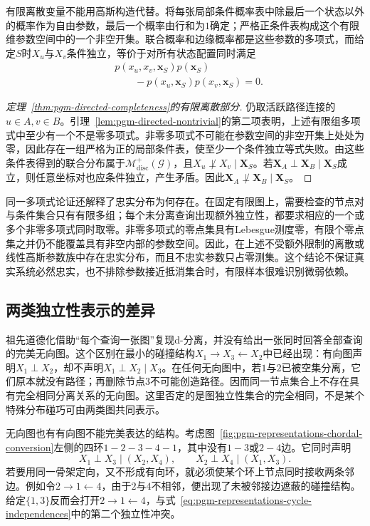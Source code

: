 有限离散变量不能用高斯构造代替。将每张局部条件概率表中除最后一个状态以外的概率作为自由参数，最后一个概率由行和为$1$确定；严格正条件表构成这个有限维参数空间中的一个非空开集。联合概率和边缘概率都是这些参数的多项式，而给定$S$时$X_u$与$X_v$条件独立，等价于对所有状态配置同时满足
\[
  \begin{aligned}
    &p(x_u,x_v,\bm x_S)p(\bm x_S)\\
    &\qquad{}-p(x_u,\bm x_S)p(x_v,\bm x_S)=0.
  \end{aligned}
\]

\begin{proof}[定理~\ref{thm:pgm-directed-completeness}的有限离散部分]
仍取活跃路径连接的$u\in A,v\in B$。引理~\ref{lem:pgm-directed-nontrivial}的第二项表明，上述有限组多项式中至少有一个不是零多项式。非零多项式不可能在参数空间的非空开集上处处为零，因此存在一组严格为正的局部条件表，使至少一个条件独立等式失败。由这些条件表得到的联合分布属于$\mathcal{M}_{\mathrm{disc}}^{+}(\mathcal{G})$，且$X_u\not\perp X_v\mid\bm X_S$。若$\bm X_A\perp\bm X_B\mid\bm X_S$成立，则任意坐标对也应条件独立，产生矛盾。因此$\bm X_A\not\perp\bm X_B\mid\bm X_S$。
\end{proof}

同一多项式论证还解释了忠实分布为何存在。在固定有限图上，需要检查的节点对与条件集合只有有限多组；每个未分离查询出现额外独立性，都要求相应的一个或多个非零多项式同时取零。非零多项式的零点集具有Lebesgue测度零，有限个零点集之并仍不能覆盖具有非空内部的参数空间。因此，在上述不受额外限制的离散或线性高斯参数族中存在忠实分布，而且不忠实参数只占零测集。这个结论不保证真实系统必然忠实，也不排除参数接近抵消集合时，有限样本很难识别微弱依赖。

\subsection{两类独立性表示的差异}
\label{sec:pgm-representations-independence-differences}

祖先道德化借助“每个查询一张图”复现d-分离，并没有给出一张同时回答全部查询的完美无向图。这个区别在最小的碰撞结构$X_1\to X_3\leftarrow X_2$中已经出现：有向图声明$X_1\perp X_2$，却不声明$X_1\perp X_2\mid X_3$。在任何无向图中，若$1$与$2$已被空集分离，它们原本就没有路径；再删除节点$3$不可能创造路径。因而同一节点集合上不存在具有完全相同分离关系的无向图。这里否定的是图独立性集合的完全相同，不是某个特殊分布碰巧可由两类图共同表示。

无向图也有有向图不能完美表达的结构。考虑图~\ref{fig:pgm-representations-chordal-conversion}左侧的四环$1-2-3-4-1$，其中没有$1-3$或$2-4$边。它同时声明
\begin{equation}
  X_1\perp X_3\mid(X_2,X_4),\qquad
  X_2\perp X_4\mid(X_1,X_3).
  \label{eq:pgm-representations-cycle-independences}
\end{equation}
若要用同一骨架定向，又不形成有向环，就必须使某个环上节点同时接收两条邻边。例如令$2\to1\leftarrow4$，由于$2$与$4$不相邻，便出现了未被邻接边遮蔽的碰撞结构。给定$\{1,3\}$反而会打开$2\to1\leftarrow4$，与式~\eqref{eq:pgm-representations-cycle-independences}中的第二个独立性冲突。


